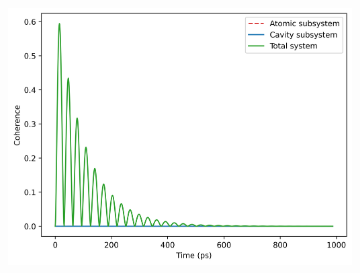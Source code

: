 \documentclass[12pt]{article}
\begin{document}
\begin{figure}[H]
    \vspace{0.5cm}
    
    \begin{subfigure}{0.45\textwidth}
        \centering
        \includegraphics[width=\linewidth]{Research Project/Code/results/JCM/OQS_Coh_Both.png}
        \caption{}
        \label{fig:JCM_OQS_Coh_Both}
    \end{subfigure}
    \hfill
    \caption{}
    \label{fig:JCM_OQS_Coh}
\end{figure}
\end{document}
